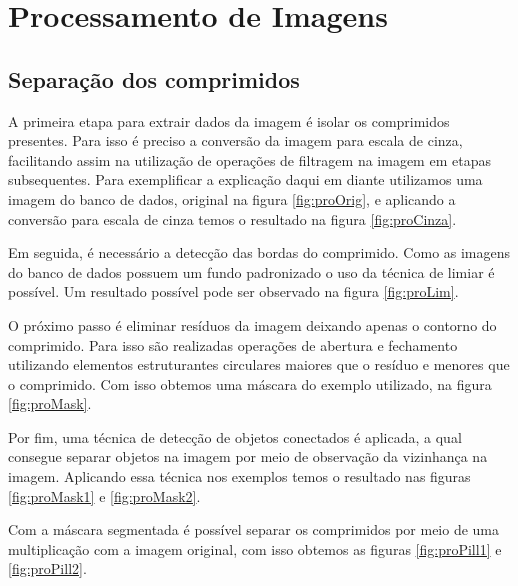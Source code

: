 \section{Processamento de Imagens}


\subsection{Separação dos comprimidos}


A primeira etapa para extrair dados da imagem é isolar os comprimidos presentes. Para isso é preciso a conversão da imagem para escala de cinza, facilitando assim na utilização de operações de filtragem na imagem em etapas subsequentes. Para exemplificar a explicação daqui em diante utilizamos uma imagem do banco de dados, original na figura \ref{fig:proOrig}, e aplicando a conversão para escala de cinza temos o resultado na figura \ref{fig:proCinza}.

Em seguida, é necessário a detecção das bordas do comprimido. Como as imagens do banco de dados possuem um fundo padronizado o uso da técnica de limiar é possível. Um resultado possível pode ser observado na figura \ref{fig:proLim}. 

O próximo passo é eliminar resíduos da imagem deixando apenas o contorno do comprimido. Para isso são realizadas operações de abertura e fechamento utilizando elementos estruturantes circulares maiores que o resíduo e menores que o comprimido. Com isso obtemos uma máscara do exemplo utilizado, na figura \ref{fig:proMask}.

Por fim, uma técnica de detecção de objetos conectados é aplicada, a qual consegue separar objetos na imagem por meio de observação da vizinhança na imagem. Aplicando essa técnica nos exemplos temos o resultado nas figuras \ref{fig:proMask1} e \ref{fig:proMask2}.

Com a máscara segmentada é possível separar os comprimidos por meio de uma multiplicação com a imagem original, com isso obtemos as figuras \ref{fig:proPill1} e \ref{fig:proPill2}.

